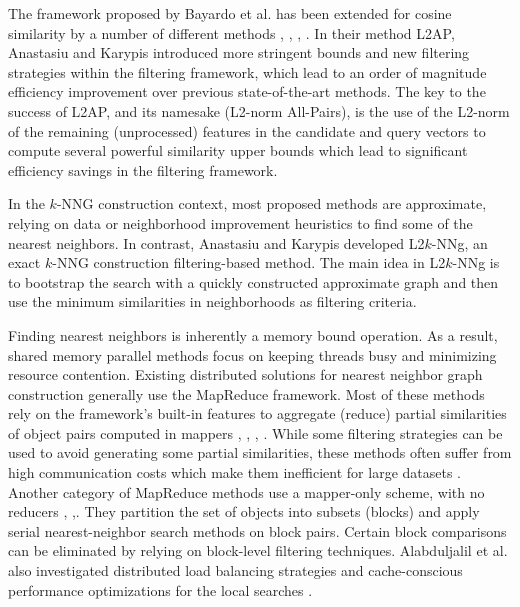 \documentclass[conference, 12pt]{IEEEtran}
\begin{document}
The framework proposed by Bayardo et al. \cite{Bayardo} has been extended for cosine
similarity by a number of different methods \cite{6816700}, \cite{5286059}, \cite{Lee}, \cite{Ribeiro}. In their method
L2AP, Anastasiu and Karypis \cite{6816700} introduced more stringent bounds and new
filtering strategies within the filtering framework, which lead to an order of
magnitude efficiency improvement over previous state-of-the-art methods. The
key to the success of L2AP, and its namesake (L2-norm All-Pairs), is the use
of the L2-norm of the remaining (unprocessed) features in the candidate and
query vectors to compute several powerful similarity upper bounds which lead
to significant efficiency savings in the filtering framework.

In the $k$-NNG construction context, most proposed methods are approximate,
relying on data \cite{Park2014} or neighborhood improvement \cite{Dong} heuristics to find some of
the nearest neighbors. In contrast, Anastasiu and Karypis \cite{Anastasiu2015} developed L2$k$-NNg,
an exact $k$-NNG construction filtering-based method. The main idea in L2$k$-NNg
is to bootstrap the search with a quickly constructed approximate graph and
then use the minimum similarities in neighborhoods as filtering criteria.

Finding nearest neighbors is inherently a memory bound operation. As a
result, shared memory parallel methods \cite{Anastasiu_2} focus on keeping threads busy
and minimizing resource contention. Existing distributed solutions for nearest
neighbor graph construction generally use the MapReduce framework. Most of
these methods rely on the framework’s built-in features to aggregate (reduce)
partial similarities of object pairs computed in mappers \cite{5694030}, \cite{de2010scaling}, \cite{Elsayed}, \cite{Lin}. While
some filtering strategies can be used to avoid generating some partial similarities,
these methods often suffer from high communication costs which make them
inefficient for large datasets \cite{Alabduljalil_1}. Another category of MapReduce methods use
a mapper-only scheme, with no reducers \cite{Alabduljalil:2013}, \cite{Alabduljalil_1},\cite{Tang}. They partition the set of
objects into subsets (blocks) and apply serial nearest-neighbor search methods
on block pairs. Certain block comparisons can be eliminated by relying on
block-level filtering techniques. Alabduljalil et al. also investigated distributed
load balancing strategies \cite{Tang} and cache-conscious performance optimizations
for the local searches \cite{Alabduljalil:2013}.
\end{document}
